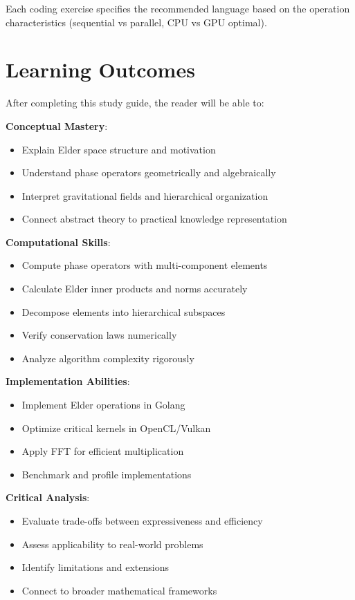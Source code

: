 \documentclass[12pt,a4paper,openany]{book}
\theoremstyle{definition}
\theoremstyle{remark}
\begin{document}
Each coding exercise specifies the recommended language based on the operation characteristics (sequential vs parallel, CPU vs GPU optimal).

\section*{Learning Outcomes}

After completing this study guide, the reader will be able to:

\textbf{Conceptual Mastery}:
\begin{itemize}
\item Explain Elder space structure and motivation
\item Understand phase operators geometrically and algebraically
\item Interpret gravitational fields and hierarchical organization
\item Connect abstract theory to practical knowledge representation
\end{itemize}

\textbf{Computational Skills}:
\begin{itemize}
\item Compute phase operators with multi-component elements
\item Calculate Elder inner products and norms accurately
\item Decompose elements into hierarchical subspaces
\item Verify conservation laws numerically
\item Analyze algorithm complexity rigorously
\end{itemize}

\textbf{Implementation Abilities}:
\begin{itemize}
\item Implement Elder operations in Golang
\item Optimize critical kernels in OpenCL/Vulkan
\item Apply FFT for efficient multiplication
\item Benchmark and profile implementations
\end{itemize}

\textbf{Critical Analysis}:
\begin{itemize}
\item Evaluate trade-offs between expressiveness and efficiency
\item Assess applicability to real-world problems
\item Identify limitations and extensions
\item Connect to broader mathematical frameworks
\end{itemize}
\end{document}
